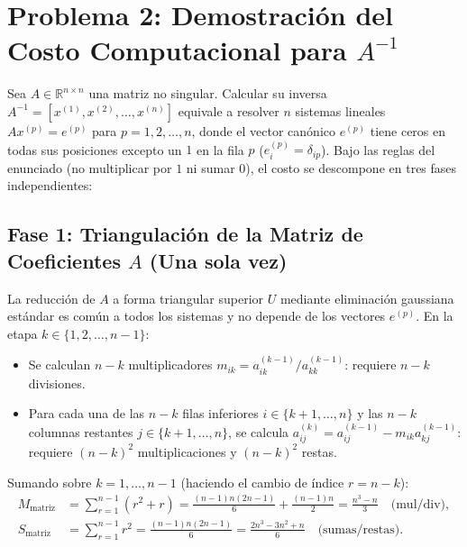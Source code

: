 \documentclass[11pt,letterpaper]{article}
\begin{document}
\section{Problema 2: Demostración del Costo Computacional para $A^{-1}$}

Sea $A \in \mathbb{R}^{n \times n}$ una matriz no singular. Calcular su inversa $A^{-1} = [x^{(1)}, x^{(2)}, \dots, x^{(n)}]$ equivale a resolver $n$ sistemas lineales $A x^{(p)} = e^{(p)}$ para $p = 1, 2, \dots, n$, donde el vector canónico $e^{(p)}$ tiene ceros en todas sus posiciones excepto un $1$ en la fila $p$ ($e_i^{(p)} = \delta_{ip}$). Bajo las reglas del enunciado (no multiplicar por $1$ ni sumar $0$), el costo se descompone en tres fases independientes:

\subsection{Fase 1: Triangulación de la Matriz de Coeficientes $A$ (Una sola vez)}
La reducción de $A$ a forma triangular superior $U$ mediante eliminación gaussiana estándar es común a todos los sistemas y no depende de los vectores $e^{(p)}$. En la etapa $k \in \{1, 2, \dots, n-1\}$:
\begin{itemize}
    \item Se calculan $n - k$ multiplicadores $m_{ik} = a_{ik}^{(k-1)} / a_{kk}^{(k-1)}$: requiere $n - k$ divisiones.
    \item Para cada una de las $n - k$ filas inferiores $i \in \{k+1, \dots, n\}$ y las $n - k$ columnas restantes $j \in \{k+1, \dots, n\}$, se calcula $a_{ij}^{(k)} = a_{ij}^{(k-1)} - m_{ik} a_{kj}^{(k-1)}$: requiere $(n-k)^2$ multiplicaciones y $(n-k)^2$ restas.
\end{itemize}
Sumando sobre $k = 1, \dots, n-1$ (haciendo el cambio de índice $r = n - k$):
\begin{align}
    M_{\text{matriz}} &= \sum_{r=1}^{n-1} \left(r^2 + r\right) = \frac{(n-1)n(2n-1)}{6} + \frac{(n-1)n}{2} = \frac{n^3 - n}{3} \quad \text{(mul/div)}, \\
    S_{\text{matriz}} &= \sum_{r=1}^{n-1} r^2 = \frac{(n-1)n(2n-1)}{6} = \frac{2n^3 - 3n^2 + n}{6} \quad \text{(sumas/restas)}.
\end{align}
\end{document}
